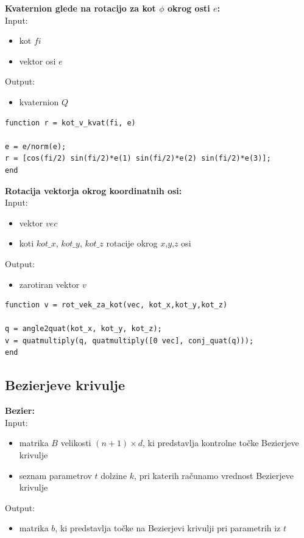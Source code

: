 \documentclass[12pt,a4paper,twoside]{article}
\theoremstyle{definition} %
\theoremstyle{plain} %
\numberwithin{equation}{section}  %
\begin{document}
\vspace{1cm}
\textbf{Kvaternion glede na rotacijo za kot $\phi$ okrog osti $e$:}\\
Input:
\begin{itemize}
\item kot $fi$
\item vektor osi $e$
\end{itemize}
Output:
\begin{itemize}
\item kvaternion $Q$
\end{itemize}

\begin{lstlisting}[caption = {kot\_v\_kvat}]
function r = kot_v_kvat(fi, e)

e = e/norm(e);
r = [cos(fi/2) sin(fi/2)*e(1) sin(fi/2)*e(2) sin(fi/2)*e(3)];
end
\end{lstlisting}

\newpage

\textbf{Rotacija vektorja okrog koordinatnih osi:}\\
Input:
\begin{itemize}
\item vektor $vec$
\item koti $kot\_x$, $kot\_y$, $kot\_z$ rotacije okrog $x$,$y$,$z$ osi
\end{itemize}
Output:
\begin{itemize}
\item zarotiran vektor $v$
\end{itemize}

\begin{lstlisting}[caption = {rot\_vek\_za\_kot}]
function v = rot_vek_za_kot(vec, kot_x,kot_y,kot_z)

q = angle2quat(kot_x, kot_y, kot_z);
v = quatmultiply(q, quatmultiply([0 vec], conj_quat(q)));
end
\end{lstlisting}

\newpage

\subsection{Bezierjeve krivulje}

\textbf{Bezier:}\\
Input:
\begin{itemize}
\item matrika $B$ velikosti $(n+1) \times d$, ki predstavlja kontrolne točke Bezierjeve krivulje
\item seznam parametrov $t$ dolzine $k$, pri katerih računamo vrednost Bezierjeve krivulje
\end{itemize}
Output:
\begin{itemize}
\item matrika $b$, ki predstavlja točke na Bezierjevi krivulji pri parametrih iz $t$
\end{itemize}
\end{document}
